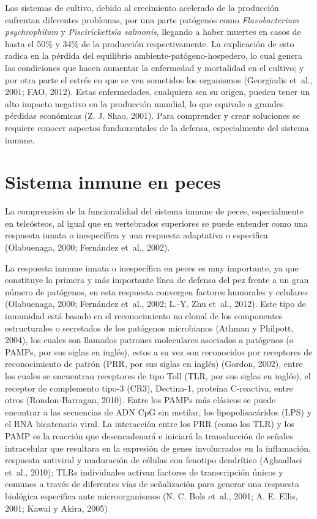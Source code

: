 \documentclass[12pt,letterpaper,oneside]{scrbook}
\begin{document}
Los sistemas de cultivo, debido al crecimiento acelerado de la
producción enfrentan diferentes problemas, por una parte patógenos como
\emph{Flavobacterium psychrophilum} y \emph{Piscirickettsia salmonis},
llegando a haber muertes en casos de hasta el 50\% y 34\% de la
producción respectivamente. La explicación de esto radica en la pérdida
del equilibrio ambiente-patógeno-hospedero, lo cual genera las
condiciones que hacen aumentar la enfermedad y mortalidad en el cultivo;
y por otra parte el estrés en que se ven sometidos los organismos
(Georgiadis et~al., 2001; FAO, 2012). Estas enfermedades, cualquiera sea
su origen, pueden tener un alto impacto negativo en la producción
mundial, lo que equivale a grandes pérdidas económicas (Z. J. Shao,
2001). Para comprender y crear soluciones se requiere conocer aspectos
fundamentales de la defensa, especialmente del sistema inmune.

\section{Sistema inmune en peces}

La comprensión de la funcionalidad del sistema inmune de peces,
especialmente en teleósteos, al igual que en vertebrados superiores se
puede entender como una respuesta innata o inespecífica y una respuesta
adaptativa o especifica (Olabuenaga, 2000; Fernández et~al., 2002).

La respuesta inmune innata o inespecífica en peces es muy importante, ya
que constituye la primera y más importante línea de defensa del pez
frente a un gran número de patógenos, en esta respuesta convergen
factores humorales y celulares (Olabuenaga, 2000; Fernández et~al.,
2002; L.-Y. Zhu et~al., 2012). Este tipo de inmunidad está basado en el
reconocimiento no clonal de los componentes estructurales o secretados
de los patógenos microbianos (Athman y Philpott, 2004), los cuales son
llamados patrones moleculares asociados a patógenos (o PAMPs, por sus
siglas en inglés), estos a su vez son reconocidos por receptores de
reconocimiento de patrón (PRR, por sus siglas en inglés) (Gordon, 2002),
entre los cuales se encuentran receptores de tipo Toll (TLR, por sus
siglas en inglés), el receptor de complemento tipo-3 (CR3), Dectina-1,
proteína C-reactiva, entre otros (Rondon-Barragan, 2010). Entre los
PAMPs más clásicos se puede encontrar a las secuencias de ADN CpG sin
metilar, los lipopolisacáridos (LPS) y el RNA bicatenario viral. La
interacción entre los PRR (como los TLR) y los PAMP es la reacción que
desencadenará e iniciará la transducción de señales intracelular que
resultara en la expresión de genes involucrados en la inflamación,
respuesta antiviral y maduración de células con fenotipo dendrítico
(Aghaallaei et~al., 2010); TLRs individuales activan factores de
transcripción únicos y comunes a través de diferentes vías de
señalización para generar una respuesta biológica especifica ante
microorganismos (N. C. Bols et~al., 2001; A. E. Ellis, 2001; Kawai y
Akira, 2005)
\end{document}
